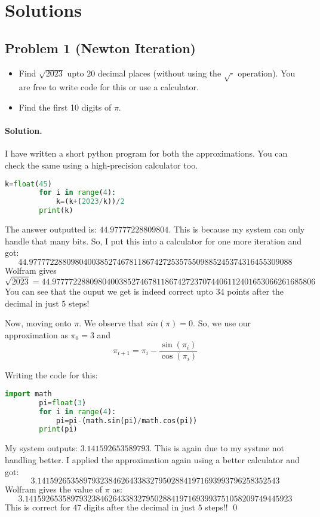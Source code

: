 \documentclass[12pt]{article}
\newenvironment{solution}
{\paragraph{Solution.}}
{\qed\eject}
\begin{document}
\eject

\section*{Solutions}

\subsection*{Problem 1 (Newton Iteration)} \begin{itemize}
    \item Find $\sqrt{2023}$ upto $20$ decimal places (without using the $\sqrt{\cdot{}}$ operation). You are free to write code for this or use a calculator.
    \item Find the first 10 digits of $\pi$.
\end{itemize}

\begin{solution}
    I have written a short python program for both the approximations. You can check the same using a high-precision calculator too.
    \begin{lstlisting}[language=python]
        k=float(45)
        for i in range(4):
            k=(k+(2023/k))/2
        print(k)
    \end{lstlisting}
    The answer outputted is: $44.97777228809804$. This is because my system can only handle that many bits. So, I put this into a calculator for one more iteration and got:
    \[44.977772288098040038527467811867427253575509885245374316455309088\]
    Wolfram gives \[\sqrt{2023}=44.977772288098040038527467811867427237074406112401653066261685806\] You can see that the ouput we get is indeed correct upto $34$ points after the decimal in just $5$ steps!

    Now, moving onto $\pi$. We observe that $sin(\pi)=0$. So, we use our approximation as $\pi_0=3$ and \[\pi_{i+1}=\pi_i-\frac{\sin(\pi_i)}{\cos(\pi_i)}\]

    Writing the code for this:
    \begin{lstlisting}[language=python]
        import math
        pi=float(3)
        for i in range(4):
            pi=pi-(math.sin(pi)/math.cos(pi))
        print(pi)
    \end{lstlisting}
    My system outputs: $3.141592653589793$. This is again due to my systme not handling better. I applied the approximation again using a better calculator and got:
    \[3.1415926535897932384626433832795028841971693993796258352543\]
    Wolfram gives the value of $\pi$ as:
    \[3.1415926535897932384626433832795028841971693993751058209749445923\]
    This is correct for $47$ digits after the decimal in just $5$ steps!!
\end{solution}
\end{document}
